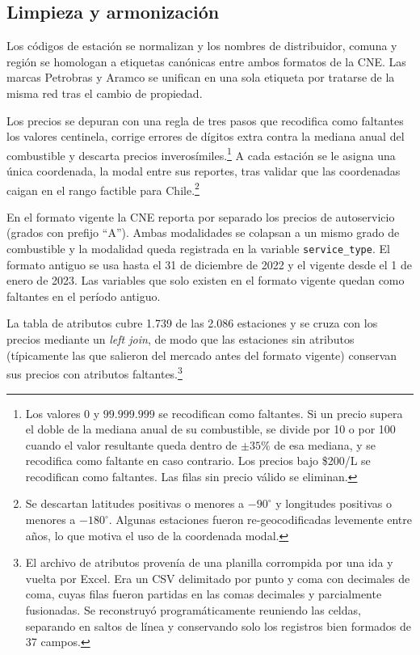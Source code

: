 \documentclass[11pt]{article}
\begin{document}
\subsection{Limpieza y armonización}
\label{sec:limpieza}

Los códigos de estación se normalizan y los nombres de distribuidor, comuna y
región se homologan a etiquetas canónicas entre ambos formatos de la CNE. Las
marcas Petrobras y Aramco se unifican en una sola etiqueta por tratarse de la
misma red tras el cambio de propiedad.

Los precios se depuran con una regla de tres pasos que recodifica como
faltantes los valores centinela, corrige errores de dígitos extra contra la
mediana anual del combustible y descarta precios inverosímiles.\footnote{Los
valores $0$ y $99.999.999$ se recodifican como faltantes. Si un precio supera
el doble de la mediana anual de su combustible, se divide por 10 o por 100
cuando el valor resultante queda dentro de $\pm 35\%$ de esa mediana, y se
recodifica como faltante en caso contrario. Los precios bajo \$200/L se
recodifican como faltantes. Las filas sin precio válido se eliminan.} A cada
estación se le asigna una única coordenada, la modal entre sus reportes, tras
validar que las coordenadas caigan en el rango factible para
Chile.\footnote{Se descartan latitudes positivas o menores a $-90^\circ$ y
longitudes positivas o menores a $-180^\circ$. Algunas estaciones fueron
re-geocodificadas levemente entre años, lo que motiva el uso de la coordenada
modal.}

En el formato vigente la CNE reporta por separado los precios de autoservicio
(grados con prefijo ``A''). Ambas modalidades se colapsan a un mismo grado de
combustible y la modalidad queda registrada en la variable
\texttt{service\_type}. El formato antiguo se usa hasta el 31 de diciembre de
2022 y el vigente desde el 1 de enero de 2023. Las variables que solo existen
en el formato vigente quedan como faltantes en el período antiguo.

La tabla de atributos cubre 1.739 de las 2.086 estaciones y se cruza con los
precios mediante un \emph{left join}, de modo que las estaciones sin
atributos (típicamente las que salieron del mercado antes del formato
vigente) conservan sus precios con atributos faltantes.\footnote{El archivo
de atributos provenía de una planilla corrompida por una ida y vuelta por
Excel. Era un CSV delimitado por punto y coma con decimales de coma, cuyas
filas fueron partidas en las comas decimales y parcialmente fusionadas. Se
reconstruyó programáticamente reuniendo las celdas, separando en saltos de
línea y conservando solo los registros bien formados de 37 campos.}
\end{document}
